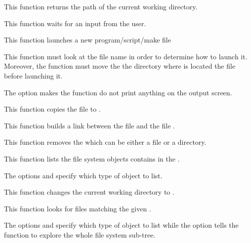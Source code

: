          {
	   This function returns the path of the current working directory.
	 }

         {
	   This function waits for an input from the user.
	 }

         {
	   This function launches a new program/script/make file \etc{}

	   \-

	   This function must look at the file name in order to determine
	   how to launch it. Moreover, the function must move the the
	   directory where is located the file before launching it.

           \-

           The option  makes the  function
           do not print anything on the output screen.
	 }

         {
	   This function copies the file  to
	   .
	 }

         {
	   This function builds a link between the file 
	   and the file .
	 }

         {
	   This function removes the  which can be either
	   a file or a directory.
	 }

         {
	   This function lists the file system objects contains in the
	   .

	   \-

	   The options  and 
	   specify which type of object to list.
	 }

         {
	   This function changes the current working directory to
	   .
	 }

         {
	   This function looks for files matching the given .

	   \-

	   The options  and 
	   specify which type of object to list while the
	    option tells the function to explore
	   the whole file system sub-tree.
	 }

